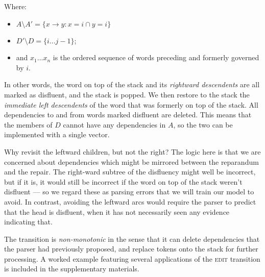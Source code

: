 \documentclass[11pt,letterpaper]{article}
\begin{document}
Where:

\begin{itemize}
    \item $A \setminus A' = \{x \rightarrow y : x = i \cap y = i \}$
    \item $D' \setminus D = \{i...j-1\}$;
\item  and $x_1...x_n$ is the ordered sequence of words preceding and formerly governed
by $i$.
\end{itemize}

In other words, the word on top of the stack and its \emph{rightward descendents}
are all marked as disfluent, and the stack is popped. We then restore to the stack
the \emph{immediate left descendents} of the word that was formerly on top of the
stack. All dependencies to and from words marked disfluent are deleted. 
This means that the members of $D$ cannot have any dependencies in $A$, so the
two can be implemented with a single vector.

Why revisit the leftward children, but not the right? The logic here is that we
are concerned about dependencies which might be mirrored between the reparandum
and the repair. The right-ward subtree of the disfluency might well be incorrect,
but if it is, it would still be incorrect if the word on top of the stack weren't
disfluent --– so we regard these as parsing errors that we will train our model
to avoid. In contrast, avoiding the leftward arcs would require the parser to
predict that the head is disfluent, when it has not necessarily seen any evidence
indicating that.

The transition is \emph{non-monotonic} in the sense that it can delete dependencies
that the parser had previously proposed, and replace tokens onto the stack for
further processing. 
A worked example featuring several applications of the \textsc{edit} transition
is included in the supplementary materials.
\end{document}

